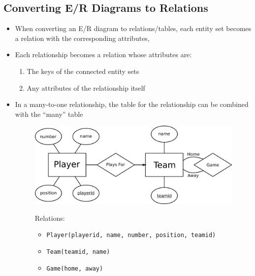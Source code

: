 \documentclass[a4paper]{article}
\begin{document}
\subsection{Converting E/R Diagrams to Relations}
\begin{itemize}
\item When converting an E/R diagram to relations/tables, each entity set becomes a relation with the corresponding attributes,
\item Each relationship becomes a relation whose attributes are:
\begin{enumerate}[label=(\roman*)]
\item The keys of the connected entity sets
\item Any attributes of the relationship itself
\end{enumerate}
\item In a many-to-one relationship, the table for the relationship can be combined with the ``many'' table

\begin{figure}[H]
\centering
\includegraphics[width=0.7\linewidth]{entity19.png}\\
\vspace{1em}

\begin{minipage}{0.8\linewidth}
\raggedright
Relations:
\begin{itemize}
\item \lstinline|Player(playerid, name, number, position, teamid)|
\item \lstinline|Team(teamid, name)|
\item \lstinline|Game(home, away)|
\end{itemize}
\end{minipage}
\end{figure}
\end{itemize}
\end{document}
